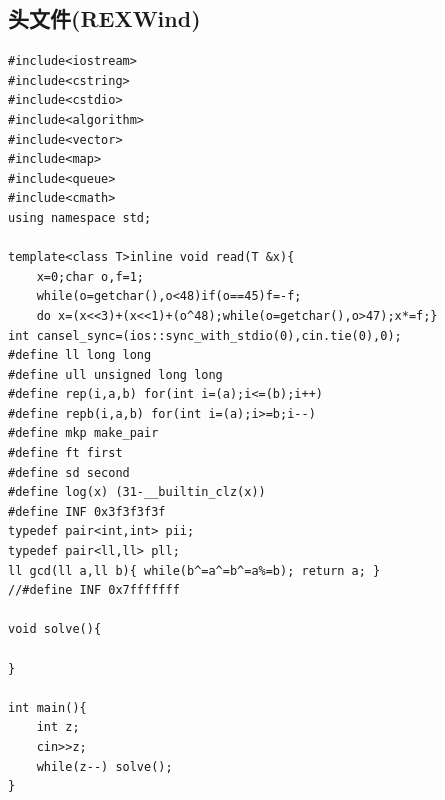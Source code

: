 \documentclass[a4]{ctexart}
\begin{document}
\subsection{头文件(REXWind)}
\begin{lstlisting}
#include<iostream>
#include<cstring>
#include<cstdio>
#include<algorithm>
#include<vector>
#include<map>
#include<queue>
#include<cmath>
using namespace std;

template<class T>inline void read(T &x){
	x=0;char o,f=1;
	while(o=getchar(),o<48)if(o==45)f=-f;
	do x=(x<<3)+(x<<1)+(o^48);while(o=getchar(),o>47);x*=f;}
int cansel_sync=(ios::sync_with_stdio(0),cin.tie(0),0);
#define ll long long
#define ull unsigned long long
#define rep(i,a,b) for(int i=(a);i<=(b);i++)
#define repb(i,a,b) for(int i=(a);i>=b;i--)
#define mkp make_pair
#define ft first
#define sd second
#define log(x) (31-__builtin_clz(x))
#define INF 0x3f3f3f3f
typedef pair<int,int> pii;
typedef pair<ll,ll> pll;
ll gcd(ll a,ll b){ while(b^=a^=b^=a%=b); return a; }
//#define INF 0x7fffffff

void solve(){
	
}

int main(){
	int z;
	cin>>z;
	while(z--) solve();
}
\end{lstlisting}
 
\end{document}
